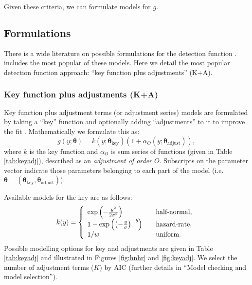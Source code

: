 \documentclass[article,shortnames]{jss}
\begin{document}
Given these criteria, we can formulate models for \(g\).

\subsection{Formulations}\label{formulations}

There is a wide literature on possible formulations for the detection
function
\citep{Buckland:1992fa, Eidous:2005bj, Becker:2009cj, Giammarino:2014eg, Miller:2015hw, Becker:2015fi}.
 includes the most popular of these models. Here we
detail the most popular detection function approach: ``key function plus
adjustments'' (K+A).

\subsubsection{Key function plus adjustments
(K+A)}\label{key-function-plus-adjustments-ka}

Key function plus adjustment terms (or adjustment series) models are
formulated by taking a ``key'' function and optionally adding
``adjustments'' to it to improve the fit \citep{Buckland:1992fa}.
Mathematically we formulate this as: \[
g(y; \boldsymbol{\theta}) = k(y; \boldsymbol{\theta}_\text{key})\left( 1+ \alpha_O(y; \boldsymbol{\theta}_\text{adjust})\right),
\] where \(k\) is the key function and \(\alpha_O\) is sum series of
functions (given in Table \ref{tab:keyadj}), described as an
\emph{adjustment of order \(O\)}. Subscripts on the parameter vector
indicate those parameters belonging to each part of the model (i.e.
\(\boldsymbol{\theta} = (\boldsymbol{\theta}_\text{key}, \boldsymbol{\theta}_\text{adjust})\)).

Available models for the key are as follows: \[
k(y) = \left\{
\begin{array}{l l}
  \exp\left(-\frac{y^2}{2 \sigma^2}\right) & \quad \text{half-normal,} \\
  1-\exp\left(\left(-\frac{y}{\sigma}\right)^{-b}\right) & \quad \text{hazard-rate,} \\
  1/w & \quad \text{uniform.}
\end{array} \right.
\] Possible modelling options for key and adjustments are given in Table
\ref{tab:keyadj} and illustrated in Figures \ref{fig:hnhr} and
\ref{fig:keyadj}. We select the number of adjustment terms (\(K\)) by
AIC (further details in ``Model checking and model selection'').
\end{document}
